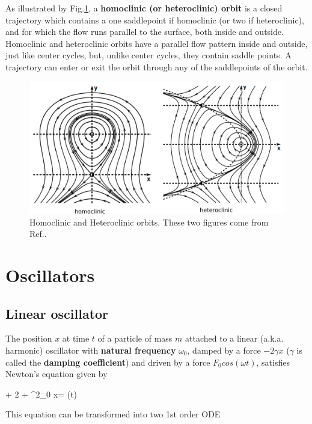 As illustrated by Fig.\ref{fig-homo-hetero-clinic}, 
a {\bf homoclinic (or heteroclinic) orbit}  is a closed trajectory which contains a one saddlepoint if homoclinic (or two if heteroclinic), and for which the flow runs
parallel to the surface, both inside and outside. 
Homoclinic and heteroclinic orbits have a parallel
flow pattern inside and outside, just like center cycles, but,
unlike center cycles,  they contain saddle points. 
A trajectory can enter or exit the orbit through any of the saddlepoints of the orbit.

\begin{figure}[h!]
\centering
\includegraphics[width=6in]
{dynamical-sys/homo-hetero-clinic.png}
\caption{Homoclinic and Heteroclinic orbits.
These two
 figures  come from Ref.\cite{dynamical-fuchs}.}
\label{fig-homo-hetero-clinic}
\end{figure}


\section{Oscillators}

\subsection{Linear oscillator}

The position $x$ 
at time $t$ of a particle of mass $m$ attached
to a linear (a.k.a. harmonic)
oscillator with {\bf natural frequency} $\omega_0$, 
damped by a force $-2\gamma x$
($\gamma$ is called the {\bf damping coefficient})
and driven by a force $F_0cos(\omega t)$,
satisfies Newton's equation given by

\beq
{} + 2\gamma {} + \omega^2_0 x= \cos(\omega t)
\label{eq-ho}
\eeq 

This equation can be transformed into two 1st order ODE

